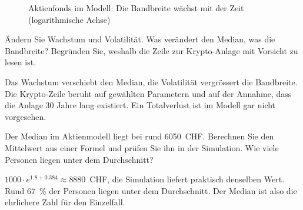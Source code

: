 \begin{figure}[H]
	\centering
	\caption{Aktienfonds im Modell: Die Bandbreite wächst mit der Zeit (logarithmische Achse)}
\end{figure}

\begin{myexercise}
	Ändern Sie Wachstum und Volatilität. Was verändert den Median, was die Bandbreite? Begründen Sie, weshalb die Zeile zur Krypto-Anlage mit Vorsicht zu lesen ist.
	\begin{myanswer}
		Das Wachstum verschiebt den Median, die Volatilität vergrössert die Bandbreite. Die Krypto-Zeile beruht auf gewählten Parametern und auf der Annahme, dass die Anlage 30 Jahre lang existiert. Ein Totalverlust ist im Modell gar nicht vorgesehen.
	\end{myanswer}
\end{myexercise}

\begin{mychallenge}
	Der Median im Aktienmodell liegt bei rund 6050~CHF. Berechnen Sie den Mittelwert aus einer Formel und prüfen Sie ihn in der Simulation. Wie viele Personen liegen unter dem Durchschnitt?
	\begin{myanswer}
		$1000 \cdot e^{1.8 + 0.384} \approx 8880$~CHF, die Simulation liefert praktisch denselben Wert. Rund 67~\% der Personen liegen unter dem Durchschnitt. Der Median ist also die ehrlichere Zahl für den Einzelfall.
	\end{myanswer}
\end{mychallenge}

